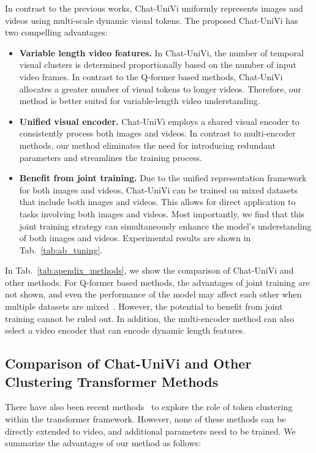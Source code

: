 \documentclass[10pt,twocolumn,letterpaper]{article}
\begin{document}
In contrast to the previous works, Chat-UniVi uniformly represents images and videos using multi-scale dynamic visual tokens. The proposed Chat-UniVi has two compelling advantages:

\begin{itemize}
\item \textbf{Variable length video features.} In Chat-UniVi, the number of temporal visual clusters is determined proportionally based on the number of input video frames. In contrast to the Q-former based methods, Chat-UniVi allocates a greater number of visual tokens to longer videos. Therefore, our method is better suited for variable-length video understanding. 

\item \textbf{Unified visual encoder.} Chat-UniVi employs a shared visual encoder to consistently process both images and videos. In contrast to multi-encoder methods, our method eliminates the need for introducing redundant parameters and streamlines the training process.

\item \textbf{Benefit from joint training.} Due to the unified representation framework for both images and videos, Chat-UniVi can be trained on mixed datasets that include both images and videos. This allows for direct application to tasks involving both images and videos. Most importantly, we find that this joint training strategy can simultaneously enhance the model's understanding of both images and videos. Experimental results are shown in Tab.~\ref{tab:ab_tuning}.
\end{itemize}

In Tab.~\ref{tab:apendix_methods}, we show the comparison of Chat-UniVi and other methods. For Q-former based methods, the advantages of joint training are not shown, and even the performance of the model may affect each other when multiple datasets are mixed~\cite{alayrac2022flamingo}. However, the potential to benefit from joint training cannot be ruled out. In addition, the multi-encoder method can also select a video encoder that can encode dynamic length features.

\subsection{Comparison of Chat-UniVi and Other Clustering Transformer Methods}
There have also been recent methods~\cite{ma2023image,xu2022groupvit,zeng2022not,jin2023video} to explore the role of token clustering within the transformer framework. However, none of these methods can be directly extended to video, and additional parameters need to be trained. We summarize the advantages of our method as follows:
\end{document}
